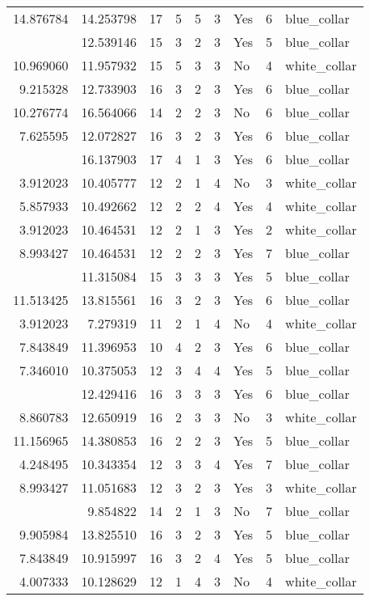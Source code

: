 \documentclass[
]{article}
\begin{document}
\begin{longtable}[t]{rrrrrllrl}
14.876784 & 14.253798 & 17 & 5 & 5 & 3 & Yes & 6 & blue\_collar\\
\addlinespace
10.820778 & 12.539146 & 15 & 3 & 2 & 3 & Yes & 5 & blue\_collar\\
10.969060 & 11.957932 & 15 & 5 & 3 & 3 & No & 4 & white\_collar\\
9.215328 & 12.733903 & 16 & 3 & 2 & 3 & Yes & 6 & blue\_collar\\
10.276774 & 16.564066 & 14 & 2 & 2 & 3 & No & 6 & blue\_collar\\
7.625595 & 12.072827 & 16 & 3 & 2 & 3 & Yes & 6 & blue\_collar\\
\addlinespace
3.912023 & 16.137903 & 17 & 4 & 1 & 3 & Yes & 6 & blue\_collar\\
3.912023 & 10.405777 & 12 & 2 & 1 & 4 & No & 3 & white\_collar\\
5.857933 & 10.492662 & 12 & 2 & 2 & 4 & Yes & 4 & white\_collar\\
3.912023 & 10.464531 & 12 & 2 & 1 & 3 & Yes & 2 & white\_collar\\
8.993427 & 10.464531 & 12 & 2 & 2 & 3 & Yes & 7 & blue\_collar\\
\addlinespace
8.306472 & 11.315084 & 15 & 3 & 3 & 3 & Yes & 5 & blue\_collar\\
11.513425 & 13.815561 & 16 & 3 & 2 & 3 & Yes & 6 & blue\_collar\\
3.912023 & 7.279319 & 11 & 2 & 1 & 4 & No & 4 & white\_collar\\
7.843849 & 11.396953 & 10 & 4 & 2 & 3 & Yes & 6 & blue\_collar\\
7.346010 & 10.375053 & 12 & 3 & 4 & 4 & Yes & 5 & blue\_collar\\
\addlinespace
8.527143 & 12.429416 & 16 & 3 & 3 & 3 & Yes & 6 & blue\_collar\\
8.860783 & 12.650919 & 16 & 2 & 3 & 3 & No & 3 & white\_collar\\
11.156965 & 14.380853 & 16 & 2 & 2 & 3 & Yes & 5 & blue\_collar\\
4.248495 & 10.343354 & 12 & 3 & 3 & 4 & Yes & 7 & blue\_collar\\
8.993427 & 11.051683 & 12 & 3 & 2 & 3 & Yes & 3 & white\_collar\\
\addlinespace
3.912023 & 9.854822 & 14 & 2 & 1 & 3 & No & 7 & blue\_collar\\
9.905984 & 13.825510 & 16 & 3 & 2 & 3 & Yes & 5 & blue\_collar\\
7.843849 & 10.915997 & 16 & 3 & 2 & 4 & Yes & 5 & blue\_collar\\
4.007333 & 10.128629 & 12 & 1 & 4 & 3 & No & 4 & white\_collar\\

\end{longtable}
\end{document}
